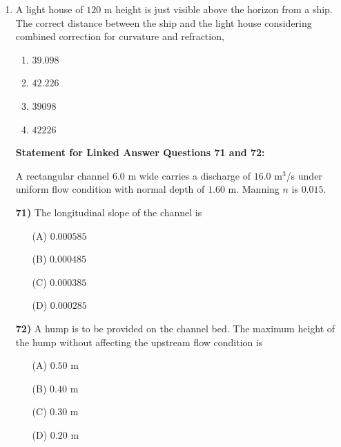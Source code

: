 \documentclass[journal]{IEEEtran}
\begin{document}
\begin{enumerate}
\item A light house of $120$ m height is just visible above the horizon from a ship. The correct distance  between the ship and the light house considering combined correction for curvature and refraction, \textbf{}
\begin{multicols}{2}
\begin{enumerate}
\item $39.098$ 
\item $42.226$ 
\item $39098$ 
\item $42226$ 
\end{enumerate}  
\end{multicols}

\vspace{0.5cm}

\textbf{Statement for Linked Answer Questions 71 and 72:}


A rectangular channel $6.0$ m wide carries a discharge of $16.0$ m$^3$/s under uniform flow condition with normal depth of $1.60$ m. Manning $n$ is $0.015$. 

\vspace{0.5cm}

\textbf{71)} \quad The longitudinal slope of the channel is \textbf{}

\begin{itemize}
    \item[(A)] $0.000585$
    \item[(B)] $0.000485$
    \item[(C)] $0.000385$
    \item[(D)] $0.000285$
\end{itemize}

\vspace{0.3cm}

\textbf{72)} \quad A hump is to be provided on the channel bed. The maximum height of the hump without affecting the upstream flow condition is \textbf{}

\begin{itemize}
    \item[(A)] $0.50$ m
    \item[(B)] $0.40$ m
    \item[(C)] $0.30$ m
    \item[(D)] $0.20$ m
\end{itemize}

\vspace{0.3cm}


\end{enumerate}
\end{document}
